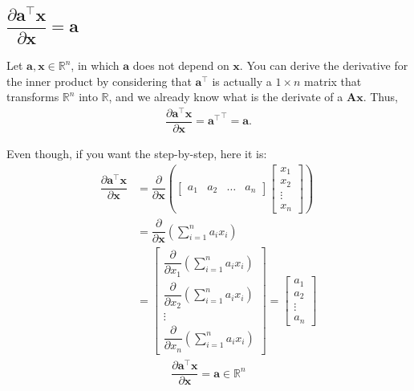 \documentclass{article}
\newcommand{\trans}{\top}
\begin{document}
\subsection{\(\dfrac{\partial \mathbf{a}^\trans \mathbf{x}}{\partial \mathbf{x}} = \mathbf{a}\)}

Let \(\mathbf{a, x} \in \mathbb{R}^{n}\), in which \(\mathbf{a}\) does not depend on \(\mathbf{x}\). You can derive the derivative for the inner product by considering that \(\mathbf{a}^\trans\) is actually a \(1\times n\) matrix that transforms \(\mathbb{R}^{n}\) into \(\mathbb{R}\), and we already know what is the derivate of a \(\mathbf{Ax}\). Thus,
\begin{align}
    \dfrac{\partial \mathbf{a}^\trans \mathbf{x}}{\partial \mathbf{x}} = {\mathbf{a}^\trans}^\trans = \mathbf{a}.
\end{align}

Even though, if you want the step-by-step, here it is:
\begin{align}
    \dfrac{\partial \mathbf{a}^\trans \mathbf{x}}{\partial \mathbf{x}} &= \dfrac{\partial}{\partial \mathbf{x}} \left(
    \begin{bmatrix}
        a_1 & a_2 & \dots & a_n
    \end{bmatrix} \begin{bmatrix}
        x_{1} \\ x_{2} \\ \vdots \\ x_{n}
    \end{bmatrix} \right) \\
    & = \dfrac{\partial}{\partial \mathbf{x}} \left( \sum_{i = 1}^n a_ix_i \right) \\
    & = \begin{bmatrix}
        \dfrac{\partial}{\partial x_1} \left( \sum_{i = 1}^n a_ix_i \right) \\ \dfrac{\partial}{\partial x_2} \left( \sum_{i = 1}^n a_ix_i \right) \\ \vdots \\ \dfrac{\partial}{\partial x_n} \left( \sum_{i = 1}^n a_ix_i \right) 
    \end{bmatrix} = \begin{bmatrix}
        a_1 \\ a_2 \\ \vdots \\ a_n
    \end{bmatrix}
\end{align}
\begin{align}
    \boxed{\dfrac{\partial \mathbf{a}^\trans \mathbf{x}}{\partial \mathbf{x}} = \mathbf{a} \in \mathbb{R}^{n}}
\end{align}
\end{document}
